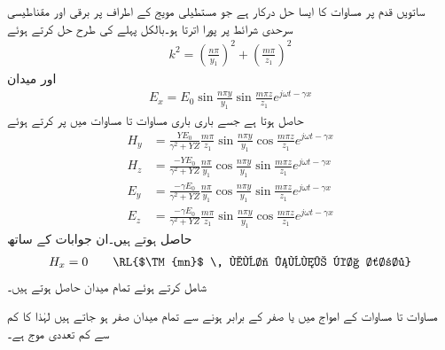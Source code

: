 ساتویں قدم پر مساوات  کا ایسا حل درکار ہے جو مستطیلی مویج کے اطراف پر برقی اور مقناطیسی سرحدی شرائط پر پورا اترتا ہو۔بالکل پہلے کی طرح حل کرتے ہوئے
\begin{align}\label{مساوات_مویج_عرضی_مقناطیسی_مستقل_قے_ب}
k^2=\left(\frac{n \pi}{y_1}\right)^2+\left(\frac{m \pi}{z_1}\right)^2
\end{align}
اور میدان
\begin{align}
E_x=E_0 \sin \frac{n \pi y}{y_1} \sin \frac{m \pi z}{z_1} e^{j \omega t -\gamma x}\label{مساوات_مویج_عرضی_مقناطیسی_حل_الف}
\end{align}
حاصل ہوتا ہے جسے باری باری مساوات  تا مساوات  میں پر کرتے ہوئے
\begin{align}
H_y&=\frac{Y E_0}{\gamma^2+YZ} \frac{m \pi}{z_1}\sin \frac{n \pi y}{y_1} \cos \frac{m \pi z}{z_1} e^{j \omega t -\gamma x} \label{مساوات_مویج_عرضی_مقناطیسی_حل_ب}\\
H_z&=\frac{-Y E_0}{\gamma^2+YZ} \frac{n\pi}{y_1}\cos \frac{n \pi y}{y_1} \sin \frac{m \pi z}{z_1} e^{j \omega t -\gamma x} \label{مساوات_مویج_عرضی_مقناطیسی_حل_پ}\\
E_y&=\frac{-\gamma E_0}{\gamma^2+YZ}\frac{n\pi}{y_1}\cos \frac{n \pi y}{y_1} \sin \frac{m \pi z}{z_1} e^{j \omega t -\gamma x} \label{مساوات_مویج_عرضی_مقناطیسی_حل_ت}\\
E_z&=\frac{-\gamma E_0}{\gamma^2+YZ} \frac{m \pi}{z_1}\sin \frac{n \pi y}{y_1} \cos \frac{m \pi z}{z_1} e^{j \omega t -\gamma x}\label{مساوات_مویج_عرضی_مقناطیسی_حل_ٹ}
\end{align}
حاصل ہوتے ہیں۔ان جوابات کے ساتھ
\begin{align}\label{مساوات_مویج_عرضی_مقناطیسی_حل_ث}
H_x=0  \quad \quad \text{\RL{$\TM{mn}$ \, موج ہونے کا شرط}} 
\end{align}
شامل کرتے ہوئے تمام میدان حاصل ہوتے ہیں۔

مساوات  تا مساوات  کے  امواج  میں  یا  صفر کے برابر ہونے سے تمام میدان صفر ہو جاتے ہیں لہٰذا  کا کم سے کم تعددی موج  ہے۔

